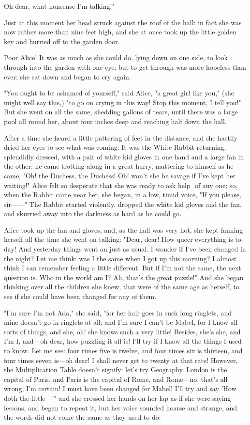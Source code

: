 Oh dear, what nonsense I'm talking!"

Just at this moment her head struck against the roof of the hall: in fact she was now rather more than nine feet high, and she at once took up the little golden key and hurried off to the garden door.

​Poor Alice! It was as much as she could do, lying down on one side, to look through into the garden with one eye; but to get through was more hopeless than ever: she sat down and began to cry again.

"You ought to be ashamed of yourself," said Alice, "a great girl like you," (she might well say this,) "to go on crying in this way! Stop this moment, I tell you!" But she went on all the same, shedding gallons of tears, until there was a large pool all round her, about four inches deep and reaching half down the hall.

After a time she heard a little pattering of feet in the distance, and she hastily dried her eyes to see what was coming. It was the White Rabbit returning, splendidly dressed, with a pair of white kid gloves in one hand and a large fan in the other: he came trotting along in a great hurry, muttering to himself as he came, "Oh! the Duchess, the Duchess! Oh! won't she be savage if I've kept her waiting!" Alice felt so desperate that she was ready to ask help ​
of any one; so, when the Rabbit came near her, she began, in a low, timid voice, "If you please, sir——" The Rabbit started violently, dropped the white kid gloves and the fan, and skurried away into the darkness as hard as he could go.

​Alice took up the fan and gloves, and, as the hall was very hot, she kept fanning herself all the time she went on talking: "Dear, dear! How queer everything is to-day! And yesterday things went on just as usual. I wonder if I've been changed in the night? Let me think: was I the same when I got up this morning? I almost think I can remember feeling a little different. But if I'm not the same, the next question is. Who in the world am I? Ah, that's the great puzzle!" And she began thinking over all the children she knew, that were of the same age as herself, to see if she could have been changed for any of them.

"I'm sure I'm not Ada," she said, "for her hair goes in such long ringlets, and mine doesn't go in ringlets at all; and I'm sure I can't be Mabel, for I know all sorts of things, and she, oh! she knows such a very little! Besides, she's she, and I'm I, and—oh dear, how puzzling it all is! I'll try if I know all the things I used to know. Let me see: four times five is twelve, ​and four times six is thirteen, and four times seven is—oh dear! I shall never get to twenty at that rate! However, the Multiplication Table doesn't signify: let's try Geography. London is the capital of Paris, and Paris is the capital of Rome, and Rome—no, that's all wrong, I'm certain! I must have been changed for Mabel! I'll try and say 'How doth the little—'" and she crossed her hands on her lap as if she were saying lessons, and began to repeat it, but her voice sounded hoarse and strange, and the words did not come the same as they used to do:—

